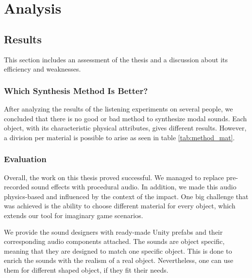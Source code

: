 \chapter{Analysis}\label{ch:analysis}

\section{Results}
This section includes an assessment of the thesis and a discussion about its efficiency and weaknesses.  

\subsection{Which Synthesis Method Is Better?}
After analyzing the results of the listening experiments on several people, we concluded that there is no good or bad method to synthesize modal sounds. Each object, with its characteristic physical attributes, gives different results. However, a division per material is possible to arise as seen in table \ref{tab:method_mat}.

\subsection{Evaluation}

Overall, the work on this thesis proved successful. We managed to replace pre-recorded sound effects with procedural audio. In addition, we made this audio physics-based and influenced by the context of the impact. One big challenge that was achieved is the ability to choose different material for every object, which extends our tool for imaginary game scenarios.

We provide the sound designers with ready-made Unity\textsuperscript{\textregistered} prefabs and their corresponding audio components attached. The sounds are object specific, meaning that they are designed to match one specific object. This is done to enrich the sounds with the realism of a real object. Nevertheless, one can use them for different shaped object, if they fit their needs. 

